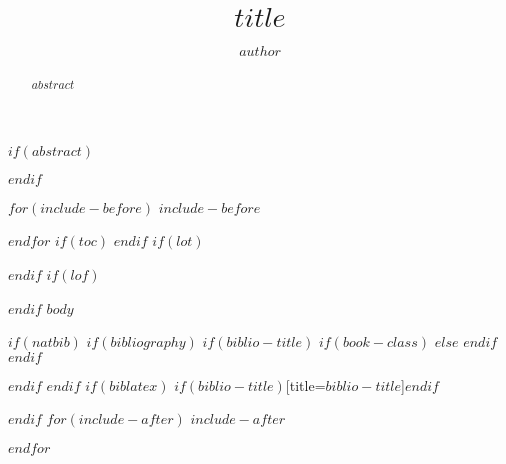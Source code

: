\documentclass[12pt]{article}
\title{$title$}
\author{$author$}
\begin{document}
\maketitle
$if(abstract)$
\begin{abstract}
$abstract$
\end{abstract}
$endif$

$for(include-before)$
$include-before$

$endfor$
$if(toc)$
{
\hypersetup{linkcolor=$if(toccolor)$$toccolor$$else$black$endif$}
\setcounter{tocdepth}{$toc-depth$}
\tableofcontents
}
$endif$
$if(lot)$
\listoftables
$endif$
$if(lof)$
\listoffigures
$endif$
$body$

$if(natbib)$
$if(bibliography)$
$if(biblio-title)$
$if(book-class)$
\renewcommand\bibname{$biblio-title$}
$else$
\renewcommand\refname{$biblio-title$}
$endif$
$endif$


$endif$
$endif$
$if(biblatex)$
\printbibliography$if(biblio-title)$[title=$biblio-title$]$endif$

$endif$
$for(include-after)$
$include-after$

$endfor$
\end{document}
